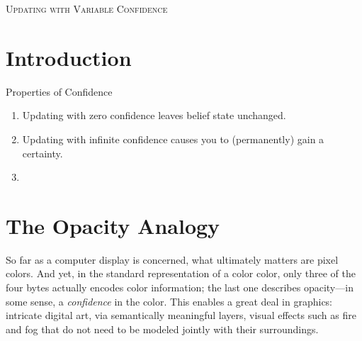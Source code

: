 \documentclass{article}
\begin{document}
\begin{center}
    \Large\scshape
    Updating with Variable Confidence
\end{center}
\bigskip

\tableofcontents


\section{Introduction}

Properties of Confidence
\begin{enumerate}[nosep]
    \item Updating with zero confidence leaves belief state unchanged.
    \item Updating with infinite confidence causes you to (permanently) gain a certainty.
    \item
\end{enumerate}


\section{The Opacity Analogy}


    So far as a computer display is concerned, what ultimately matters are pixel colors.
    And yet, in the standard representation of a color color, only three of the four bytes actually encodes color information; the last one describes opacity---in some sense, a \emph{confidence} in the color.
    This enables a great deal in graphics: intricate digital art, via semantically meaningful layers,
        visual effects such as fire and fog that do not need to be modeled jointly with their surroundings.
\end{document}
